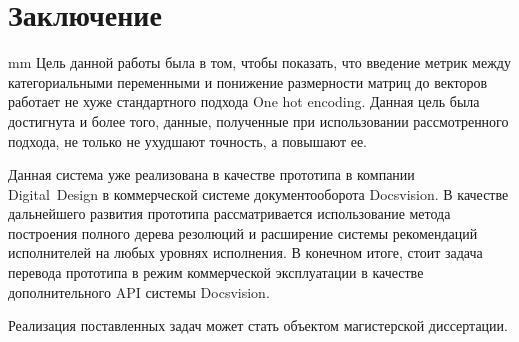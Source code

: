 \newpage
\section*{\LARGE\bf{Заключение}}
 mm
Цель данной работы была в том, чтобы показать, что введение метрик между категориальными переменными и понижение размерности матриц до векторов работает не хуже стандартного подхода One hot encoding. Данная цель была достигнута и более того, данные, полученные при использовании рассмотренного подхода, не только не ухудшают точность, а повышают ее.
\par
Данная система уже реализована в качестве прототипа в компании \\Digital~Design в коммерческой системе документооборота Docsvision. В качестве дальнейшего развития прототипа рассматривается использование метода построения полного дерева резолюций и расширение системы рекомендаций исполнителей на любых уровнях исполнения. В конечном итоге, стоит задача перевода прототипа в режим коммерческой эксплуатации в качестве дополнительного API системы Docsvision.
\par
Реализация поставленных задач может стать объектом магистерской диссертации.